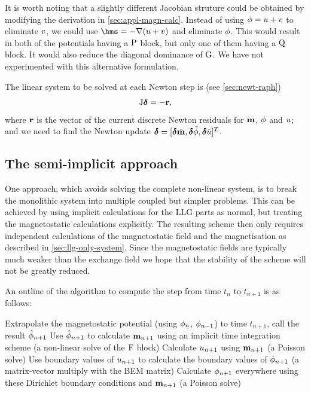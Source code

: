 It is worth noting that a slightly different Jacobian struture could be obtained by modifying the derivation in \cref{sec:appl-magn-calc}.
Instead of using $\phi = u + v$ to eliminate $v$, we could use $\hms = - \grad ( \phione + \phitwo)$ and eliminate $\phi$.
This would result in both of the potentials having a $\mathrm{P}$ block, but only one of them having a $\mathrm{Q}$ block.
It would also reduce the diagonal dominance of ${\mathbf{\mathrm{G}}}$.
We have not experimented with this alternative formulation.

The linear system to be solved at each Newton step is (see \cref{sec:newt-raph})
\begin{equation}
  \mathrm{J} \boldsymbol{\mathrm{\delta}} = -\boldsymbol{\mathrm{r}},
  \label{eq:87}
\end{equation}
where $\boldsymbol{\mathrm{r}}$ is the vector of the current discrete Newton residuals for $\boldsymbol{\mathrm{m}}$, $\phi$ and $u$; and we need to find the Newton update $\boldsymbol{\mathrm{\delta}} = [\boldsymbol{\mathrm{\delta}}\tilde{\boldsymbol{\mathrm{m}}}, \boldsymbol{\mathrm{\delta}}\tilde{\phi}, \boldsymbol{\mathrm{\delta}}\tilde{u}]^T$.


\subsection{The semi-implicit approach}
\label{sec:semi-implicit-bem}

One approach, which avoids solving the complete non-linear system, is to break the monolithic system into multiple coupled but simpler problems.
This can be achieved by using implicit calculations for the LLG parts as normal, but treating the magnetostatic calculations explicitly.
The resulting scheme then only requires independent calculations of the magnetostatic field and the magnetisation as described in \cref{sec:llg-only-system}.
Since the magnetostatic fields are typically much weaker than the exchange field we hope that the stability of the scheme will not be greatly reduced.

An outline of the algorithm to compute the step from time $t_n$ to $t_{n+1}$ is as follows:
\begin{algorithm}[H]
  Extrapolate the magnetostatic potential (using $\phi_n$, $\phi_{n-1}$) to time $t_{n+1}$, call the result $\hat{\phi}_{n+1}$\;
  Use $\hat{\phi}_{n+1}$ to calculate $\boldsymbol{\mathrm{m}}_{n+1}$ using an implicit time integration scheme (a non-linear solve of the $\mathrm{F}$ block)\;
  Calculate $u_{n+1}$ using $\boldsymbol{\mathrm{m}}_{n+1}$ (a Poisson solve)\;
  Use boundary values of $u_{n+1}$ to calculate the boundary values of $\phi_{n+1}$ (a matrix-vector multiply with the BEM matrix)\;
  Calculate $\phi_{n+1}$ everywhere using these Dirichlet boundary conditions and $\boldsymbol{\mathrm{m}}_{n+1}$ (a Poisson solve)\;
\end{algorithm}

